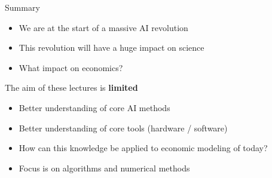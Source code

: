 \begin{frame}{Summary}

    \begin{itemize}
        \item We are at the start of a massive AI revolution
        \vspace{0.2em}
        \item This revolution will have a huge impact on science
        \vspace{0.2em}
        \item What impact on economics?
    \end{itemize}

        \vspace{0.2em}
        \vspace{0.2em}
        \vspace{0.2em}
        \vspace{0.2em}
    \pause
    The aim of these lectures is \textbf{limited}

        \vspace{0.2em}
    \begin{itemize}
        \item Better understanding of core AI methods
        \vspace{0.2em}
        \item Better understanding of core tools (hardware / software)
        \vspace{0.2em}
        \item How can this knowledge be applied to economic modeling of today?
        \vspace{0.2em}
        \item Focus is on algorithms and numerical methods
    \end{itemize}

\end{frame}





